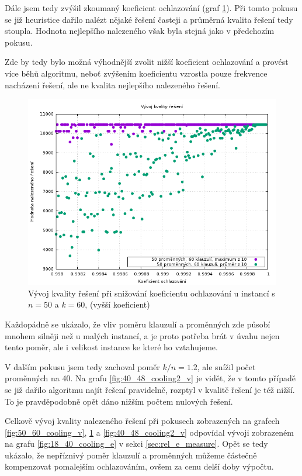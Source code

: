 \documentclass[11pt]{article}
\begin{document}
Dále jsem tedy zvýšil zkoumaný koeficient ochlazování (graf \ref{fig:50_60_cooling2_v}). Při tomto pokusu se již heuristice dařilo nalézt nějaké řešení časteji a průměrná kvalita řešení tedy stoupla. Hodnota nejlepšího nalezeného však byla stejná jako v předchozím pokusu.

Zde by tedy bylo možná výhodnější zvolit nižší koeficient ochlazování a provést více běhů algoritmu, neboť zvýšením koeficientu vzrostla pouze frekvence nacházení řešení, ale ne kvalita nejlepšího nalezeného řešení.

\begin{figure}[h!]
	\centering
	\includegraphics[width=\textwidth]{../grafy/50_60_cooling2_v.png}
	\caption{Vývoj kvality řešení při snižování koeficientu ochlazování u instancí s $n=50$ a $k=60$, (vyšší koeficient)}
	\label{fig:50_60_cooling2_v}
\end{figure}

Každopádně se ukázalo, že vliv poměru klauzulí a proměnných zde působí mnohem silněji než u malých instancí, a je proto potřeba brát v úvahu nejen tento poměr, ale i velikost instance ke které ho vztahujeme.

V dalším pokusu jsem tedy zachoval poměr $k/n = 1.2$, ale snížil počet proměnných na 40. Na grafu \ref{fig:40_48_cooling2_v} je vidět, že v tomto případě se již dařilo algoritmu najít řešení pravidelně, rozptyl v kvalitě řešení je též nižší. To je pravděpodobně opět dáno nižším počtem nulových řešení.

Celkově vývoj kvality nalezeného řešení při pokusech zobrazených na grafech \ref{fig:50_60_cooling_v}, \ref{fig:50_60_cooling2_v} a \ref{fig:40_48_cooling2_v} odpovídal vývoji zobrazeném na grafu \ref{fig:18_40_cooling_e} v sekci \ref{sec:rel_e_measure}. Opět se tedy ukázalo, že nepříznivý poměr klauzulí a proměnných můžeme částečně kompenzovat pomalejším ochlazováním, ovšem za cenu delší doby výpočtu.
\end{document}
